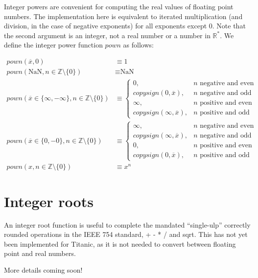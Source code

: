 \documentclass[letterpaper,10pt]{article}
\newcommand{\NaN}{\text{NaN}}
\begin{document}
 Integer powers are convenient for computing the real values of floating point numbers. The implementation here is equivalent to iterated multiplication (and division, in the case of negative exponents) for all exponents except 0. Note that the second argument is an integer, not a real number or a number in $\mathbb{R}^*$. We define the integer power function $pown$ as follows:

\begin{align}
 pown(\overline{x}, 0) &\equiv 1 \\
 pown(\NaN, n \in \mathbb{Z} \setminus \{0\}) &\equiv \NaN \\
 pown(\overline{x} \in \{\infty, -\infty\}, n \in \mathbb{Z} \setminus \{0\}) &\equiv
 \begin{cases}
  0,                              &\text{$n$ negative and even} \\
  copysign(0, \overline{x}),      &\text{$n$ negative and odd} \\
  \infty,                         &\text{$n$ positive and even} \\
  copysign(\infty, \overline{x}), &\text{$n$ positive and odd}
 \end{cases} \\
 pown(\overline{x} \in \{0, -0\}, n \in \mathbb{Z} \setminus \{0\}) &\equiv
 \begin{cases}
  \infty,                         &\text{$n$ negative and even}\\
  copysign(\infty, \overline{x}), &\text{$n$ negative and odd}\\
  0,                              &\text{$n$ positive and even}\\
  copysign(0, \overline{x}),      &\text{$n$ positive and odd}
 \end{cases} \\
 pown(x, n \in \mathbb{Z} \setminus \{0\}) &\equiv x^n
\end{align}

\section{Integer roots}

An integer root function is useful to complete the mandated ``single-ulp'' correctly rounded operations in the IEEE 754 standard, + - * / and sqrt. This has not yet been implemented for Titanic, as it is not needed to convert between floating point and real numbers.

More details coming soon!
\end{document}
